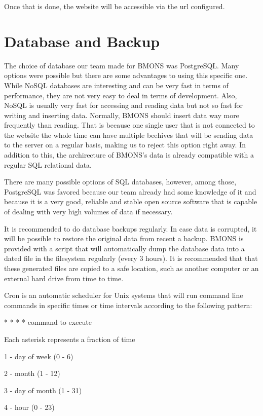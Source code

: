 Once that is done, the website will be accessible via the url configured.

\clearpage
\section{Database and Backup}

The choice of database our team made for BMONS was PostgreSQL. Many options were possible but there are some advantages to using this specific one. While NoSQL databases are interesting and can be very fast in terms of performance, they are not very easy to deal in terms of development. Also, NoSQL is usually very fast for accessing and reading data but not so fast for writing and inserting data. Normally, BMONS should insert data way more frequently than reading. That is because one single user that is not connected to the website the whole time can have multiple beehives that will be sending data to the server on a regular basis, making us to reject this option right away. In addition to this, the archirecture of BMONS's data is already compatible with a regular SQL relational data.


There are many possible options of SQL databases, however, among those, PostgreSQL was favored because our team already had some knowledge of it and because it is a very good, reliable and stable open source software that is capable of dealing with very high volumes of data if necessary.


It is recommended to do database backups regularly. In case data is corrupted, it will be possible to restore the original data from recent a backup. BMONS is provided with a script that will automatically dump the database data into a dated file in the filesystem regularly (every 3 hours). It is recommended that that these generated files are copied to a safe location, such as another computer or an external hard drive from time to time.


Cron is an automatic scheduler for Unix systems that will run command line commands in specific times or time intervals according to the following pattern:

\indent\indent  * * * * *  command to execute


Each asterisk represents a fraction of time

1 - day of week (0 - 6)

2 - month (1 - 12)

3 - day of month (1 - 31)

4 - hour (0 - 23)

